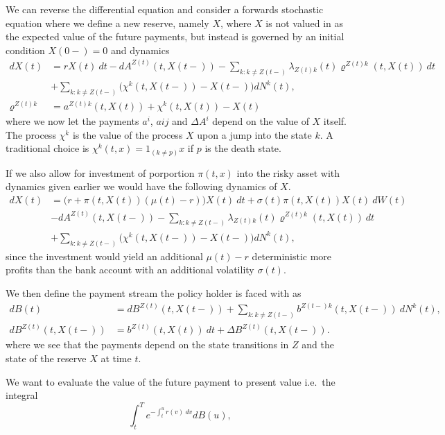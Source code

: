 \documentclass[
]{book}
\begin{document}
We can reverse the differential equation and consider a forwards stochastic equation where we define a new reserve, namely \(X\), where \(X\) is not valued in as the expected value of the future payments, but instead is governed by an initial condition \(X(0-)=0\) and dynamics
\begin{align*}
dX(t)&=rX(t)\ dt-dA^{Z(t)}(t,X(t-))-\sum_{k:k\ne Z(t-)}\lambda_{Z(t)k}(t) \varrho^{Z(t)k}(t,X(t))\ dt\\
&+\sum_{k:k\ne Z(t-)}\Big(\chi^k(t,X(t-))-X(t-)\Big)dN^k(t),\\
\varrho^{Z(t)k}&=a^{Z(t)k}(t,X(t))+\chi^k(t,X(t))-X(t)
\end{align*}
where we now let the payments \(a^i\), \(a{ij}\) and \(\Delta A^i\) depend on the value of \(X\) itself. The process \(\chi^k\) is the value of the process \(X\) upon a jump into the state \(k\). A traditional choice is \(\chi^k(t,x)=1_{(k\ne p)}x\) if \(p\) is the death state.

If we also allow for investment of porportion \(\pi(t,x)\) into the risky asset with dynamics given earlier we would have the following dynamics of \(X\).
\begin{align*}
dX(t)&=\Big(r+\pi(t,X(t))(\mu(t)-r)\Big)X(t)\ dt+\sigma(t)\pi(t,X(t))X(t)\ dW(t)\\
&-dA^{Z(t)}(t,X(t-))-\sum_{k:k\ne Z(t-)}\lambda_{Z(t)k}(t) \varrho^{Z(t)k}(t,X(t))\ dt\\
&+\sum_{k:k\ne Z(t-)}\Big(\chi^k(t,X(t-))-X(t-)\Big)dN^k(t),
\end{align*}
since the investment would yield an additional \(\mu(t)-r\) deterministic more profits than the bank account with an additional volatility \(\sigma(t)\).

We then define the payment stream the policy holder is faced with as
\begin{align*}
dB(t)&=dB^{Z(t)}(t,X(t-))+\sum_{k:k\ne Z(t-)}b^{Z(t-)k}(t,X(t-))\ dN^k(t),\\
dB^{Z(t)}(t,X(t-))&=b^{Z(t)}(t,X(t))\ dt + \Delta B^{Z(t)}(t,X(t-)).
\end{align*}
where we see that the payments depend on the state transitions in \(Z\) and the state of the reserve \(X\) at time \(t\).

We want to evaluate the value of the future payment to present value i.e.~the integral
\[
\int_t^Te^{-\int_t^u r(v)\ dv}dB(u),
\]
\end{document}
